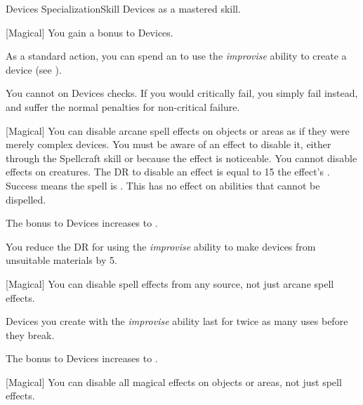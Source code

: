     \begin{feat}{Devices Specialization}{Skill}
        \featpre Devices as a mastered skill.
        \featben

        [Magical] You gain a  bonus to Devices.

         As a standard action, you can spend an  to use the \textit{improvise} ability to create a device (see ).

         You cannot  on Devices checks.
        If you would critically fail, you simply fail instead, and suffer the normal penalties for non-critical failure.

        [Magical] You can disable arcane spell effects on objects or areas as if they were merely complex devices.
        You must be aware of an effect to disable it, either through the Spellcraft skill or because the effect is noticeable.
        You cannot disable effects on creatures.
        The DR to disable an effect is equal to 15 \add the effect's .
        Success means the spell is .
        This has no effect on abilities that cannot be dispelled.

         The bonus to Devices increases to .

         You reduce the DR for using the \textit{improvise} ability to make devices from unsuitable materials by 5.

        [Magical] You can disable spell effects from any source, not just arcane spell effects.

         Devices you create with the \textit{improvise} ability last for twice as many uses before they break.

         The bonus to Devices increases to .

        [Magical] You can disable all magical effects on objects or areas, not just spell effects.
    \end{feat}

